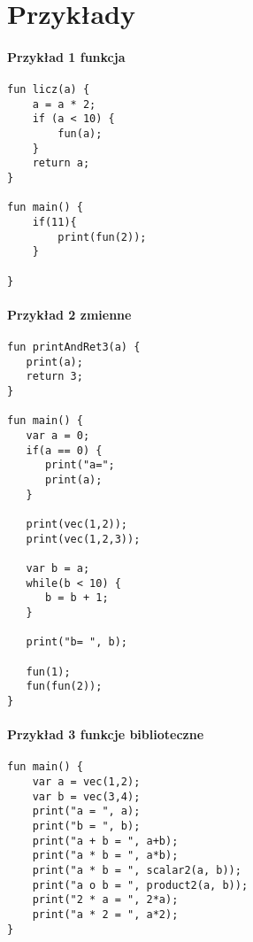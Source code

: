 \documentclass[11pt]{article} %
\begin{document}
\section{Przykłady}

\paragraph{Przykład 1 funkcja}
\begin{verbatim}
fun licz(a) {
    a = a * 2;   
    if (a < 10) {      
        fun(a);   
    }    		 
    return a;  	
}  				
	
fun main() {
    if(11){
        print(fun(2));
    }
	  
}					
\end{verbatim}

\paragraph{Przykład 2 zmienne}
\begin{verbatim}
fun printAndRet3(a) {
   print(a);
   return 3;
}

fun main() {
   var a = 0;
   if(a == 0) {
      print("a=";
      print(a);
   }

   print(vec(1,2));
   print(vec(1,2,3));

   var b = a;
   while(b < 10) {
      b = b + 1;
   }
   
   print("b= ", b);
   
   fun(1);
   fun(fun(2));
}   
\end{verbatim}

\paragraph{Przykład 3 funkcje biblioteczne}
\begin{verbatim}
fun main() {
    var a = vec(1,2);
    var b = vec(3,4);
    print("a = ", a);
    print("b = ", b);
    print("a + b = ", a+b);
    print("a * b = ", a*b);
    print("a * b = ", scalar2(a, b));
    print("a o b = ", product2(a, b));
    print("2 * a = ", 2*a);    	
    print("a * 2 = ", a*2);
}   
\end{verbatim}
\end{document}
